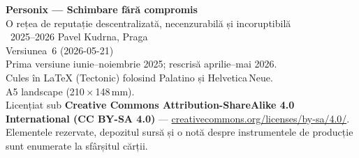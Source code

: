 \thispagestyle{empty}
\ifdefined\printmode\vspace*{\fill}\else{}\fi
\begin{flushleft}\small\sffamily
\textbf{Personix --- Schimbare fără compromis}\\[0.3em]
O rețea de reputație descentralizată, necenzurabilă și incoruptibilă\\[1.4em]

\textcopyright\ 2025--2026 Pavel Kudrna, Praga\\[0.4em]

Versiunea~6 (2026-05-21)\\
Prima versiune iunie--noiembrie 2025; rescrisă aprilie--mai 2026.\\[1.4em]

Cules în \LaTeX{} (Tectonic) folosind Palatino și Helvetica\,Neue.\\
A5 landscape (210\,$\times$\,148\,mm).\\[1.4em]

Licențiat sub \textbf{Creative Commons Attribution-ShareAlike 4.0
International (CC BY-SA 4.0)} ---
\href{https://creativecommons.org/licenses/by-sa/4.0/}{creativecommons.org/licenses/by-sa/4.0/}.
Elementele rezervate, depozitul sursă și o notă despre instrumentele de
producție sunt enumerate la sfârșitul cărții.
\end{flushleft}
\ifdefined\printmode\else{}\fi
\clearpage
